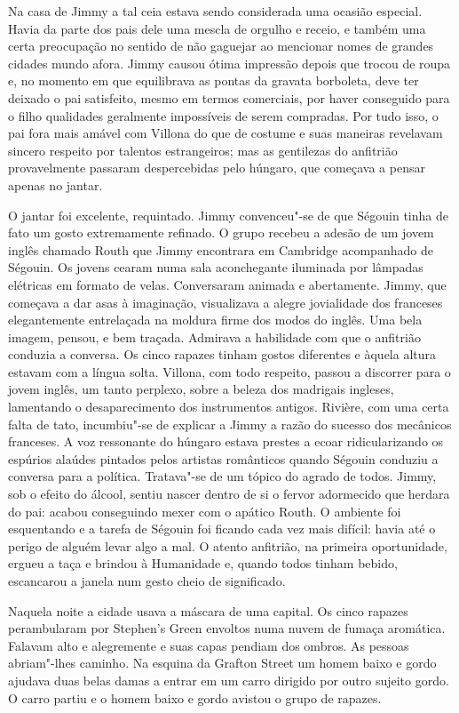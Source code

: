 Na casa de Jimmy a tal ceia estava sendo considerada uma ocasião especial.
Havia da parte dos pais dele uma mescla de orgulho e receio, e também uma certa
preocupação no sentido de não gaguejar ao mencionar nomes de grandes cidades
mundo afora.  Jimmy causou ótima impressão depois que trocou de roupa e, no
momento em que equilibrava as pontas da gravata borboleta, deve ter deixado o
pai satisfeito, mesmo em termos comerciais, por haver conseguido para o filho
qualidades geralmente impossíveis de serem compradas.  Por tudo isso, o pai
fora mais amável com Villona do que de costume e suas maneiras revelavam
sincero respeito por talentos estrangeiros; mas as gentilezas do anfitrião
provavelmente passaram despercebidas pelo húngaro, que começava a pensar apenas
no jantar.

O jantar foi excelente, requintado.  Jimmy convenceu"-se de que Ségouin tinha de
fato um gosto extremamente refinado.  O grupo recebeu a adesão de um jovem
inglês chamado Routh que Jimmy encontrara em Cambridge acompanhado de Ségouin.
Os jovens cearam numa sala aconchegante iluminada por lâmpadas elétricas em
formato de velas.  Conversaram animada e abertamente.  Jimmy, que começava a
dar asas à imaginação, visualizava a alegre jovialidade dos franceses
elegantemente entrelaçada na moldura firme dos modos do inglês.  Uma bela
imagem, pensou, e bem traçada.  Admirava a habilidade com que o anfitrião
conduzia a conversa.  Os cinco rapazes tinham gostos diferentes e àquela altura
estavam com a língua solta.  Villona, com todo respeito, passou a discorrer
para o jovem inglês, um tanto perplexo, sobre a beleza dos madrigais ingleses,
lamentando o desaparecimento dos instrumentos antigos.  Rivière, com uma certa
falta de tato, incumbiu"-se de explicar a Jimmy a razão do sucesso dos mecânicos
franceses.  A voz ressonante do húngaro estava prestes a ecoar ridicularizando
os espúrios alaúdes pintados pelos artistas românticos quando Ségouin conduziu
a conversa para a política.  Tratava"-se de um tópico do agrado de todos.
Jimmy, sob o efeito do álcool, sentiu nascer dentro de si o fervor adormecido
que herdara do pai: acabou conseguindo mexer com o apático Routh.  O ambiente
foi esquentando e a tarefa de Ségouin foi ficando cada vez mais difícil: havia
até o perigo de alguém levar algo a mal.  O atento anfitrião, na primeira
oportunidade, ergueu a taça e brindou à Humanidade e, quando todos tinham
bebido, escancarou a janela num gesto cheio de significado.

Naquela noite a cidade usava a máscara de uma capital.  Os cinco rapazes
perambularam por Stephen’s Green envoltos numa nuvem de fumaça aromática.
Falavam alto e alegremente e suas capas pendiam dos ombros.  As pessoas
abriam"-lhes caminho.  Na esquina da Grafton Street um homem baixo e gordo
ajudava duas belas damas a entrar em um carro dirigido por outro sujeito gordo.
O carro partiu e o homem baixo e gordo avistou o grupo de rapazes.

